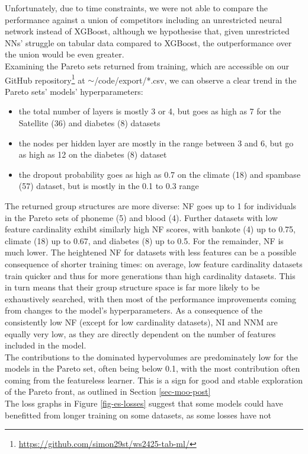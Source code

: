 \documentclass[twoside,11pt]{article}
\begin{document}
Unfortunately, due to time constraints, we were not able to compare the performance against a union of competitors including an unrestricted neural network
instead of XGBoost, although we hypothesise that, given unrestricted NNs' struggle on tabular data compared to XGBoost, the outperformance over the union would
be even greater.
\\
Examining the Pareto sets returned from training, which are accessible on our GitHub repository\footnote{\url{https://github.com/simon29st/ws2425-tab-ml/}}
at $\sim$/code/export/*.csv, we can observe a clear trend in the
Pareto sets' models' hyperparameters:
\begin{itemize}
  \item the total number of layers is mostly 3 or 4, but goes as high as 7 for the Satellite (36) and diabetes (8) datasets
  \item the nodes per hidden layer are mostly in the range between 3 and 6, but go as high as 12 on the diabetes (8) dataset
  \item the dropout probability goes as high as 0.7 on the climate (18) and spambase (57) dataset, but is mostly in the 0.1 to 0.3 range
\end{itemize}
The returned group structures are more diverse:
NF goes up to 1 for individuals in the Pareto sets of phoneme (5) and blood (4). Further datasets with low feature cardinality exhibt similarly high
NF scores, with bankote (4) up to 0.75, climate (18) up to 0.67, and diabetes (8) up to 0.5. For the remainder, NF is much lower. The heightened NF for
datasets with less features can be a possible consequence of shorter training times: on average, low feature cardinality datasets train quicker and thus
for more generations than high cardinality datasets. This in turn means that their group structure space is far more likely to be exhaustively searched,
with then most of the performance improvements coming from changes to the model's hyperparameters.
As a consequence of the consistently low NF (except for low cardinality datasets), NI and NNM are equally very low, as they are directly dependent on the
number of features included in the model.
\\
The contributions to the dominated hypervolumes are predominately low for the models in the Pareto set, often being below 0.1, with the most contribution
often coming from the featureless learner. This is a sign for good and stable exploration of the Pareto front, as outlined in Section \ref{sec-moo-post}
\\
The loss graphs in Figure \ref{fig-es-losses} suggest that some models could have benefitted from longer training on some datasets, as some losses have not
\end{document}
